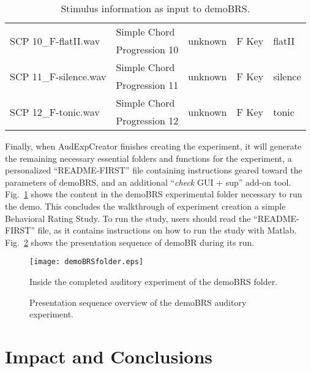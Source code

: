 \documentclass[preprint,12pt, a4paper]{elsarticle}
\begin{document}
\begin{table}[h]
\begin{tabular}{|l|l|l|l|l|}
        \hline
        \multirow{2}{*}{SCP 10\_F-flatII.wav} & Simple Chord & \multirow{2}{*}{unknown} & 
        \multirow{2}{*}{F Key} & \multirow{2}{*}{flatII} \\ & Progression 10 & & & \\
        \hline
        \multirow{2}{*}{SCP 11\_F-silence.wav} & Simple Chord & \multirow{2}{*}{unknown} & \multirow{2}{*}{F Key} & \multirow{2}{*}{silence} \\ & Progression 11 & & & \\
        \hline
        \multirow{2}{*}{SCP 12\_F-tonic.wav} & Simple Chord & \multirow{2}{*}{unknown} & 
        \multirow{2}{*}{F Key} & \multirow{2}{*}{tonic} \\ & Progression 12 & & & \\
        \hline
        
    \end{tabular}
    \caption{Stimulus information as input to demoBRS.}
    \label{tab:stimInfo}
\end{table}


Finally, when AudExpCreator finishes creating the experiment, it will generate the remaining necessary essential folders and functions for the experiment, a personalized ``README-FIRST'' file containing instructions geared toward the parameters of demoBRS, and an additional ``\textit{check} GUI + sup'' add-on tool. Fig.~\ref{fig:completedExptFolder} shows the content in the demoBRS experimental folder necessary to run the demo. This concludes the walkthrough of experiment creation a simple Behavioral Rating Study. To run the study, users should read the ``README-FIRST'' file, as it contains instructions on how to run the study with Matlab. Fig.~\ref{fig:presentationDemo} shows the presentation sequence of demoBR during its run.

\begin{figure}[h]
\centering
\texttt{[image: demoBRSfolder.eps]}
\caption{{Inside the completed auditory experiment of the demoBRS folder.}}
\label{fig:completedExptFolder}
\end{figure}

\begin{figure}[h]
\centering
{}
\caption{{Presentation sequence overview of the demoBRS auditory experiment.}}
\label{fig:presentationDemo}
\end{figure}

\section{Impact and Conclusions}
\label{sec:conclusion}
\end{document}
